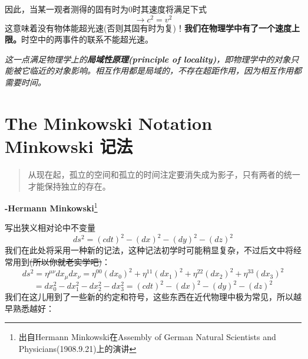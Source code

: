 因此，当某一观者测得的固有时为0时其速度将满足下式
\begin{equation}\label{eq2.22}
  \rightarrow c^2 =v^2
\end{equation}
这意味着没有物体能超光速(否则其固有时为复)！{\bf{我们在物理学中有了一个速度上限。}}时空中的两事件的联系不能超光速。

{\it{这一点满足物理学上的{\bf{局域性原理(principle of locality)}}，即物理学中的对象只能被它临近的对象影响。相互作用都是局域的，不存在超距作用，因为相互作用都需要时间。}}

\section[Minkowski记法]{The Minkowski Notation Minkowski 记法}
\label{sec2.4}
\begin{quote}
从现在起，孤立的空间和孤立的时间注定要消失成为影子，只有两者的统一才能保持独立的存在。
\end{quote}
\begin{flushright}
  {\bf{-Hermann Minkowski}}\footnote{出自Hermann Minkowski在Assembly of German Natural Scientists and Physicians(1908.9.21)上的演讲}
\end{flushright}
写出狭义相对论中不变量
\begin{equation}\label{eq2.23}
 ds^2=(cdt)^2-(dx)^2-(dy)^2-(dz)^2
\end{equation}
我们在此处将采用一种新的记法，这种记法初学时可能稍显复杂，不过后文中将经常用到\sout{(所以你就老实学吧)}：
\[
 ds^2=\eta^{\mu\nu}dx_\mu dx_\nu
  =\eta^{00}(dx_0)^2+\eta^{11}(dx_1)^2+\eta^{22}(dx_2)^2+\eta^{33}(dx_3)^2
\]
\begin{equation}\label{eq2.24}
 =dx_0^2-dx_1^2-dx_2^2-dx_3^2=(cdt)^2-(dx)^2-(dy)^2-(dz)^2
\end{equation}
我们在这儿用到了一些新的约定和符号，这些东西在近代物理中极为常见，所以越早熟悉越好：
